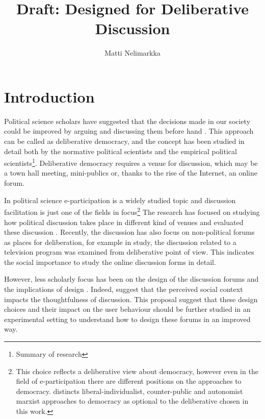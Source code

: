 \documentclass[journal,a4paper]{IEEEtran}
\author{Matti Nelimarkka}
\title{Draft: Designed for Deliberative Discussion}
\begin{document}
\maketitle

\setlength{\parindent}{0pt}
\setlength{\parskip}{1ex}

\section{Introduction}

Political science scholars have suggested that the decisions made in our society could be improved by arguing and discussing them before hand \cite{xxx}. This approach can be called as deliberative democracy, and the concept has been studied in detail both by the normative political scientists and the empirical political scientists\footnote{Summary of research}. Deliberative democracy requires a venue for discussion, which may be a town hall meeting, mini-publics or, thanks to the rise of the Internet, an online forum.

In political science e-participation is a widely studied topic and discussion facilitation is just one of the fields in focus\footnote{This choice reflects a deliberative view about democracy, however even in the field of e-participation there are different positions on the approaches to democracy.  distincts liberal-individualist, counter-public and autonomist marxist approaches to democracy as optional to the deliberative chosen in this work.} The research has focused on studying how political discussion takes place in different kind of venues  and evaluated these discussion . Recently, the discussion has also focus on non-political forums as places for deliberation, for example in  study, the discussion related to a television program was examined from deliberative point of view. This indicates the social importance to study the online discussion forms in detail.

However, less scholarly focus has been on the design of the discussion forums and the implications of design . Indeed,  suggest that the perceived social context impacts the thoughtfulness of discussion. This proposal suggest that these design choices and their impact on the user behaviour should be further studied in an experimental setting to understand how to design these forums in an improved way.
\end{document}
